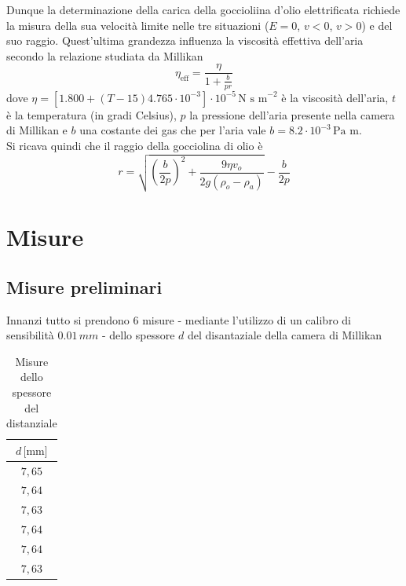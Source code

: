 \documentclass[]{article}
\let\oldsection\section%
\renewcommand{\section}{%
	\renewcommand{\theequation}{\thesection.\arabic{equation}}%
	\oldsection}%
\let\oldsubsection\subsection%
\renewcommand{\subsection}{%
	\renewcommand{\theequation}{\thesubsection.\arabic{equation}}%
	\oldsubsection}%
\begin{document}
    Dunque la determinazione della carica della goccioliina d'olio elettrificata richiede la misura della sua velocità limite nelle tre situazioni ($E=0$, $v<0$, $v>0$) e del suo raggio. Quest'ultima grandezza influenza la viscosità effettiva dell'aria secondo la relazione studiata da Millikan
    \begin{equation}
        \label{eta_eff}
        \eta_{\text{eff}}=\frac{\eta}{1 + \frac{b}{p r}}
    \end{equation}
    dove $\displaystyle \eta = \left[1.800 + (T -15)4.765 \cdot 10^{-3} \right] \cdot 10^{-5} \,\text{N s m}^{-2}$ è la viscosità dell'aria, $t$ è la temperatura (in gradi Celsius), $p$ la pressione dell'aria presente nella camera di Millikan e $b$ una costante dei gas che per l'aria vale $b=8.2 \cdot 10^{-3} \, \text{Pa m}$.\\ Si ricava quindi che il raggio della gocciolina di olio è 
    \begin{equation}
        \label{raggio-def}
        r=\sqrt{\left( \frac{b}{2p} \right) ^2 + \frac{9 \eta v_o}{2 g \left(\rho_o - \rho_a \right)}} - \frac{b}{2p}
    \end{equation}


    \section{Misure}

    \subsection{Misure preliminari}
    \label{par:misure-preliminari}

    Innanzi tutto si prendono 6 misure - mediante l'utilizzo di un calibro di sensibilità $ 0.01\, mm $ - dello spessore $ d $ del disantaziale della camera di Millikan

    \begin{table}[H]
        \centering
    
        \begin{tabular}{||c||}
            \hline
            $d\, \text{[mm]} $ \\
            \hline\hline
    
            $ 7,65 $ \\\hline
            $ 7,64 $ \\\hline
            $ 7,63 $ \\\hline
            $ 7,64 $ \\\hline
            $ 7,64 $ \\\hline
            $ 7,63 $ \\\hline

        
        \end{tabular}
        \caption{Misure dello spessore del distanziale}
        \label{distanziale}
    \end{table}
\end{document}
